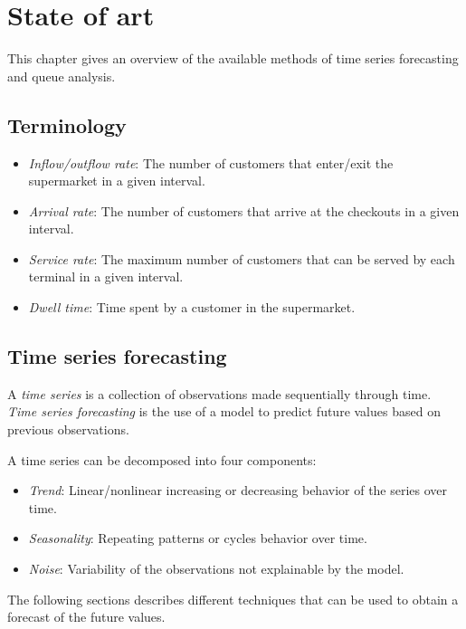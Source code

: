 \chapter{State of art}
\label{cha:state_of_art}

This chapter gives an overview of the available methods of time series forecasting and queue analysis.

\section{Terminology}
\label{sec:terminology}

\begin{itemize}
  \item \emph{Inflow/outflow rate}: The number of customers that enter/exit the supermarket in a given interval.
  \item \emph{Arrival rate}: The number of customers that arrive at the checkouts in a given interval.
  \item \emph{Service rate}: The maximum number of customers that can be served by each terminal in a given interval.
  \item \emph{Dwell time}: Time spent by a customer in the supermarket.
\end{itemize}


\section{Time series forecasting}
\label{sec:time_series_forecasting}

A \emph{time series} is a collection of observations made sequentially through time. \emph{Time series forecasting} is the use of a model to predict future values based on previous observations.

A time series can be decomposed into four components:
\begin{itemize}
  \item \emph{Trend}: Linear/nonlinear increasing or decreasing behavior of the series over time.
  \item \emph{Seasonality}: Repeating patterns or cycles behavior over time.
  \item \emph{Noise}: Variability of the observations not explainable by the model.
\end{itemize}

The following sections describes different techniques that can be used to obtain a forecast of the future values.


